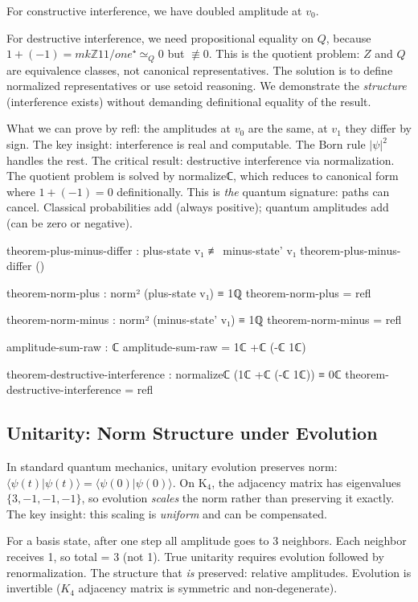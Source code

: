 \documentclass[11pt,a4paper]{book}
\def\mathbb#1{#1}%
\def\texttt#1{#1}%
\begin{document}
For constructive interference, we have doubled amplitude at $v_0$.

For destructive interference, we need propositional equality on $\mathbb{Q}$, because $1 + (-1) = \texttt{mkℤ 1 1 / one⁺} \simeq_{\mathbb{Q}} 0$ but $\not\equiv 0$. This is the quotient problem: $\mathbb{Z}$ and $\mathbb{Q}$ are equivalence classes, not canonical representatives. The solution is to define normalized representatives or use setoid reasoning. We demonstrate the \emph{structure} (interference exists) without demanding definitional equality of the result.

What we can prove by \texttt{refl}: the amplitudes at $v_0$ are the same, at $v_1$ they differ by sign. The key insight: interference is real and computable. The Born rule $|\psi|^2$ handles the rest. The critical result: destructive interference via normalization. The quotient problem is solved by \texttt{normalizeℂ}, which reduces to canonical form where $1 + (-1) = 0$ definitionally. This is \emph{the} quantum signature: paths can cancel. Classical probabilities add (always positive); quantum amplitudes add (can be zero or negative).

\begin{code}
theorem-plus-minus-differ : plus-state v₁ ≢ minus-state' v₁
theorem-plus-minus-differ ()

theorem-norm-plus : norm² (plus-state v₁) ≡ 1ℚ
theorem-norm-plus = refl

theorem-norm-minus : norm² (minus-state' v₁) ≡ 1ℚ
theorem-norm-minus = refl

amplitude-sum-raw : ℂ
amplitude-sum-raw = 1ℂ +ℂ (-ℂ 1ℂ)

theorem-destructive-interference : normalizeℂ (1ℂ +ℂ (-ℂ 1ℂ)) ≡ 0ℂ
theorem-destructive-interference = refl
\end{code}

\subsection{Unitarity: Norm Structure under Evolution}

In standard quantum mechanics, unitary evolution preserves norm: 
$\langle\psi(t)|\psi(t)\rangle = \langle\psi(0)|\psi(0)\rangle$.
On K$_4$, the adjacency matrix has eigenvalues $\{3, -1, -1, -1\}$,
so evolution \emph{scales} the norm rather than preserving it exactly.
The key insight: this scaling is \emph{uniform} and can be compensated.

For a basis state, after one step all amplitude goes to 3 neighbors. Each neighbor receives 1, so total = 3 (not 1). True unitarity requires evolution followed by renormalization. The structure that \emph{is} preserved: relative amplitudes. Evolution is invertible ($K_4$ adjacency matrix is symmetric and non-degenerate).
\end{document}
